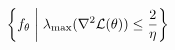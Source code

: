 \documentclass[preview]{standalone}
\begin{document}
\begin{align*}
\special{dvisvgm:raw <g id='unique000'>}\left\{f_\theta\;\middle|\;\lambda_{\max}(\nabla^2\mathcal{L}(\theta))\le\frac{2}{\eta}\right\}\special{dvisvgm:raw </g>}
\end{align*}
\end{document}
